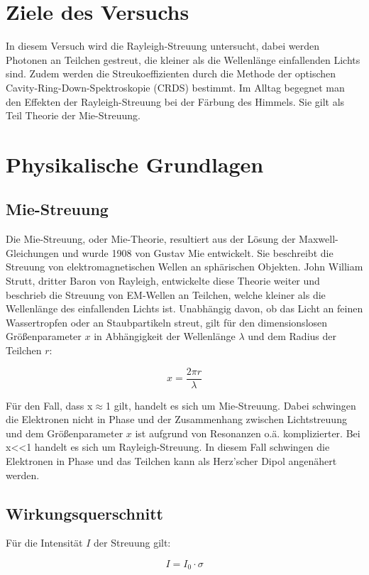 \section{Ziele des Versuchs}
In diesem Versuch wird die Rayleigh-Streuung untersucht, dabei werden Photonen an Teilchen gestreut, die kleiner als die Wellenlänge einfallenden Lichts sind. Zudem werden die Streukoeffizienten durch die Methode der optischen Cavity-Ring-Down-Spektroskopie (CRDS) bestimmt. Im Alltag begegnet man den Effekten der Rayleigh-Streuung bei der Färbung des Himmels. Sie gilt als Teil Theorie der Mie-Streuung.

\section{Physikalische Grundlagen}
\subsection{Mie-Streuung}
Die Mie-Streuung, oder Mie-Theorie, resultiert aus der Lösung der Maxwell-Gleichungen und wurde 1908 von Gustav Mie entwickelt. Sie beschreibt die Streuung von elektromagnetischen Wellen an sphärischen Objekten. John William Strutt, dritter Baron von Rayleigh, entwickelte diese Theorie weiter und beschrieb die Streuung von EM-Wellen an Teilchen, welche kleiner als die Wellenlänge des einfallenden Lichts ist. Unabhängig davon, ob das Licht an feinen Wassertropfen oder an Staubpartikeln streut, gilt für den dimensionslosen Größenparameter $x$ in Abhängigkeit der Wellenlänge $\lambda$ und dem Radius der Teilchen $r$:

\begin{equation}
x = \frac{2\pi r}{\lambda}
\end{equation}

Für den Fall, dass x$\approx$1 gilt, handelt es sich um Mie-Streuung. Dabei schwingen die Elektronen nicht in Phase und der Zusammenhang zwischen Lichtstreuung und dem Größenparameter $x$ ist aufgrund von Resonanzen o.ä. komplizierter. Bei x<<1 handelt es sich um Rayleigh-Streuung. In diesem Fall schwingen die Elektronen in Phase und das Teilchen kann als Herz'scher Dipol angenähert werden.

\subsection{Wirkungsquerschnitt}
Für die Intensität $I$ der Streuung gilt:

\begin{equation}
I = I_0 \cdot \sigma 
\end{equation}

